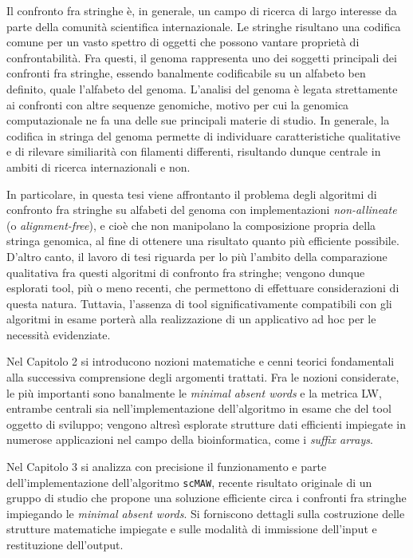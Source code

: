 Il confronto fra stringhe è, in generale, un campo di ricerca di largo interesse da parte della comunità scientifica internazionale. Le stringhe risultano una codifica comune per un vasto spettro di oggetti che possono vantare proprietà di confrontabilità. Fra questi, il genoma rappresenta uno dei soggetti  principali dei confronti fra stringhe, essendo banalmente codificabile su un alfabeto ben definito, quale l'alfabeto del genoma. L'analisi del genoma è legata strettamente ai confronti con altre sequenze genomiche, motivo per cui la genomica computazionale ne fa una delle sue principali materie di studio. In generale, la codifica in stringa del genoma permette di individuare caratteristiche qualitative e di rilevare similiarità con filamenti differenti, risultando dunque centrale in ambiti di ricerca internazionali e non.

\vspace{3mm}

In particolare, in questa tesi viene affrontanto il problema degli algoritmi di confronto fra stringhe su alfabeti del genoma con implementazioni \textit{non-allineate} (o \textit{alignment-free}), e cioè che non manipolano la composizione propria della stringa genomica, al fine di ottenere una risultato quanto più efficiente possibile. D'altro canto, il lavoro di tesi riguarda per lo più l'ambito della comparazione qualitativa fra questi algoritmi di confronto fra stringhe; vengono dunque esplorati tool, più o meno recenti, che permettono di effettuare considerazioni di questa natura. Tuttavia, l'assenza di tool significativamente compatibili con gli algoritmi in esame porterà alla realizzazione di un applicativo ad hoc per le necessità evidenziate. 

\vspace{3mm}

Nel Capitolo 2 si introducono nozioni matematiche e cenni teorici fondamentali alla successiva comprensione degli argomenti trattati. Fra le nozioni considerate, le più importanti sono banalmente le \textit{minimal absent words} e la metrica LW, entrambe centrali sia nell'implementazione dell'algoritmo in esame che del tool oggetto di sviluppo; vengono altresì esplorate strutture dati efficienti impiegate in numerose applicazioni nel campo della bioinformatica, come i \textit{suffix arrays}.

Nel Capitolo 3 si analizza con precisione il funzionamento e parte dell'implementazione dell'algoritmo \verb|scMAW|, recente risultato originale di un gruppo di studio che propone una soluzione efficiente circa i confronti fra stringhe impiegando le \textit{minimal absent words}. Si forniscono dettagli sulla costruzione delle strutture matematiche impiegate e sulle modalità di immissione dell'input e restituzione dell'output.

